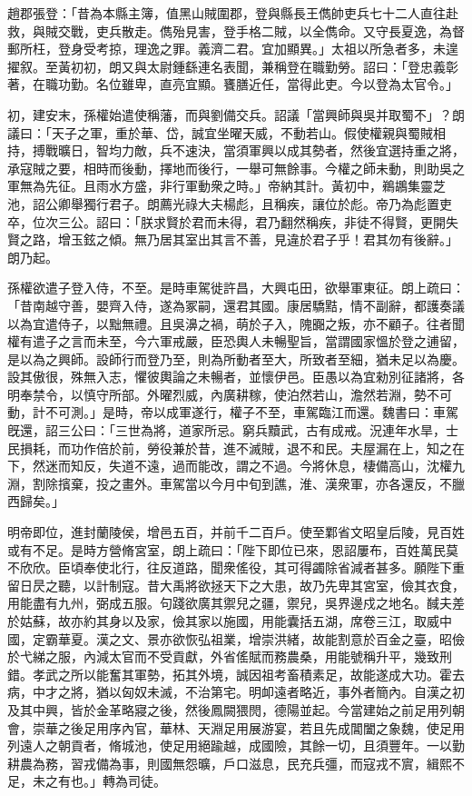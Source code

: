 \begin{pinyinscope}
趙郡張登：「昔為本縣主簿，值黑山賊圍郡，登與縣長王儁帥吏兵七十二人直往赴救，與賊交戰，吏兵散走。儁殆見害，登手格二賊，以全儁命。又守長夏逸，為督郵所枉，登身受考掠，理逸之罪。義濟二君。宜加顯異。」太祖以所急者多，未遑擢叙。至黃初初，朗又與太尉鍾繇連名表聞，兼稱登在職勤勞。詔曰：「登忠義彰著，在職功勤。名位雖卑，直亮宜顯。饔膳近任，當得此吏。今以登為太官令。」

初，建安末，孫權始遣使稱藩，而與劉備交兵。詔議「當興師與吳并取蜀不」？朗議曰：「天子之軍，重於華、岱，誠宜坐曜天威，不動若山。假使權親與蜀賊相持，搏戰曠日，智均力敵，兵不速決，當須軍興以成其勢者，然後宜選持重之將，承寇賊之要，相時而後動，擇地而後行，一舉可無餘事。今權之師未動，則助吳之軍無為先征。且雨水方盛，非行軍動衆之時。」帝納其計。黃初中，鵜鶘集靈芝池，詔公卿舉獨行君子。朗薦光祿大夫楊彪，且稱疾，讓位於彪。帝乃為彪置吏卒，位次三公。詔曰：「朕求賢於君而未得，君乃翻然稱疾，非徒不得賢，更開失賢之路，增玉鉉之傾。無乃居其室出其言不善，見違於君子乎！君其勿有後辭。」朗乃起。

孫權欲遣子登入侍，不至。是時車駕徙許昌，大興屯田，欲舉軍東征。朗上疏曰：「昔南越守善，嬰齊入侍，遂為冢嗣，還君其國。康居驕黠，情不副辭，都護奏議以為宜遣侍子，以黜無禮。且吳濞之禍，萌於子入，隗嚻之叛，亦不顧子。往者聞權有遣子之言而未至，今六軍戒嚴，臣恐輿人未暢聖旨，當謂國家慍於登之逋留，是以為之興師。設師行而登乃至，則為所動者至大，所致者至細，猶未足以為慶。設其傲很，殊無入志，懼彼輿論之未暢者，並懷伊邑。臣愚以為宜勑別征諸將，各明奉禁令，以慎守所部。外曜烈威，內廣耕稼，使泊然若山，澹然若淵，勢不可動，計不可測。」是時，帝以成軍遂行，權子不至，車駕臨江而還。魏書曰：車駕旣還，詔三公曰：「三世為將，道家所忌。窮兵黷武，古有成戒。況連年水旱，士民損耗，而功作倍於前，勞役兼於昔，進不滅賊，退不和民。夫屋漏在上，知之在下，然迷而知反，失道不遠，過而能改，謂之不過。今將休息，棲備高山，沈權九淵，割除擯棄，投之畫外。車駕當以今月中旬到譙，淮、漢衆軍，亦各還反，不臘西歸矣。」

明帝即位，進封蘭陵侯，增邑五百，并前千二百戶。使至鄴省文昭皇后陵，見百姓或有不足。是時方營脩宮室，朗上疏曰：「陛下即位已來，恩詔屢布，百姓萬民莫不欣欣。臣頃奉使北行，往反道路，聞衆傜役，其可得蠲除省減者甚多。願陛下重留日昃之聽，以計制寇。昔大禹將欲拯天下之大患，故乃先卑其宮室，儉其衣食，用能盡有九州，弼成五服。句踐欲廣其禦兒之疆，禦兒，吳界邊戍之地名。馘夫差於姑蘇，故亦約其身以及家，儉其家以施國，用能囊括五湖，席卷三江，取威中國，定霸華夏。漢之文、景亦欲恢弘祖業，增崇洪緒，故能割意於百金之臺，昭儉於弋綈之服，內減太官而不受貢獻，外省傜賦而務農桑，用能號稱升平，幾致刑錯。孝武之所以能奮其軍勢，拓其外境，誠因祖考畜積素足，故能遂成大功。霍去病，中才之將，猶以匈奴未滅，不治第宅。明卹遠者略近，事外者簡內。自漢之初及其中興，皆於金革略寢之後，然後鳳闕猥閌，德陽並起。今當建始之前足用列朝會，崇華之後足用序內官，華林、天淵足用展游宴，若且先成閶闔之象魏，使足用列遠人之朝貢者，脩城池，使足用絕踰越，成國險，其餘一切，且須豐年。一以勤耕農為務，習戎備為事，則國無怨曠，戶口滋息，民充兵彊，而寇戎不賔，緝熙不足，未之有也。」轉為司徒。


\end{pinyinscope}
